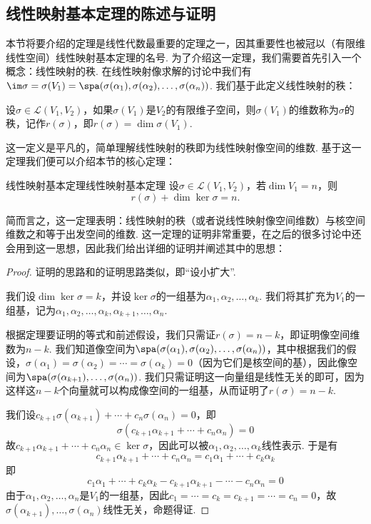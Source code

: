 \subsection{线性映射基本定理的陈述与证明}

本节将要介绍的定理是线性代数最重要的定理之一，因其重要性也被冠以（有限维线性空间）线性映射基本定理的名号. 为了介绍这一定理，我们需要首先引入一个概念：线性映射的秩. 在线性映射像求解的讨论中我们有$\im \sigma=\sigma(V_1)=\spa(\sigma(\alpha_1),\sigma(\alpha_2),\ldots,\sigma(\alpha_n))$. 我们基于此定义线性映射的秩：
\begin{definition}{}{}
    设$\sigma\in \mathcal{L}(V_1,V_2)$，如果$\sigma(V_1)$是$V_2$的有限维子空间，则$\sigma(V_1)$的维数称为$\sigma$的秩，记作$r(\sigma)$，即$r(\sigma)=\dim \sigma(V_1)$.
\end{definition}

这一定义是平凡的，简单理解线性映射的秩即为线性映射像空间的维数. 基于这一定理我们便可以介绍本节的核心定理：

\begin{theorem}{线性映射基本定理}{线性映射基本定理}
    设$\sigma \in \mathcal{L}(V_1,V_2)$，若$\dim V_1=n$，则
    \[r(\sigma)+\dim\ker\sigma=n.\]
\end{theorem}
简而言之，这一定理表明：线性映射的秩（或者说线性映射像空间维数）与核空间维数之和等于出发空间的维数. 这一定理的证明非常重要，在之后的很多讨论中还会用到这一思想，因此我们给出详细的证明并阐述其中的思想：

\begin{proof}
    证明的思路和的证明思路类似，即``设小扩大''.

    我们设$\dim\ker\sigma=k$，并设$\ker\sigma$的一组基为$\alpha_1,\alpha_2,\ldots,\alpha_k$. 我们将其扩充为$V_1$的一组基，记为$\alpha_1,\alpha_2,\ldots,\alpha_k,\alpha_{k+1},\ldots,\alpha_n$.

    根据定理要证明的等式和前述假设，我们只需证$r(\sigma)=n-k$，即证明像空间维数为$n-k$. 我们知道像空间为$\spa(\sigma(\alpha_1),\sigma(\alpha_2),\ldots,\sigma(\alpha_n))$，其中根据我们的假设，$\sigma(\alpha_1)=\sigma(\alpha_2)=\cdots=\sigma(\alpha_k)=0$（因为它们是核空间的基），因此像空间为$\spa(\sigma(\alpha_{k+1}),\ldots,\sigma(\alpha_n))$. 我们只需证明这一向量组是线性无关的即可，因为这样这$n-k$个向量就可以构成像空间的一组基，从而证明了$r(\sigma)=n-k$.

    我们设$c_{k+1}\sigma(\alpha_{k+1})+\cdots+c_n\sigma(\alpha_n)=0$，即
    \[\sigma(c_{k+1}\alpha_{k+1}+\cdots+c_n\alpha_n)=0\]
    故$c_{k+1}\alpha_{k+1}+\cdots+c_n\alpha_n \in \ker\sigma$，因此可以被$\alpha_1,\alpha_2,\ldots,\alpha_k$线性表示. 于是有
    \[c_{k+1}\alpha_{k+1}+\cdots+c_n\alpha_n=c_1\alpha_1+\cdots+c_k\alpha_k\]
    即
    \[c_1\alpha_1+\cdots+c_k\alpha_k-c_{k+1}\alpha_{k+1}-\cdots-c_n\alpha_n=0\]
    由于$\alpha_1,\alpha_2,\ldots,\alpha_n$是$V_1$的一组基，因此$c_1=\cdots=c_k=c_{k+1}=\cdots=c_n=0$，故$\sigma(\alpha_{k+1}),\ldots,\sigma(\alpha_n)$线性无关，命题得证.
\end{proof}

